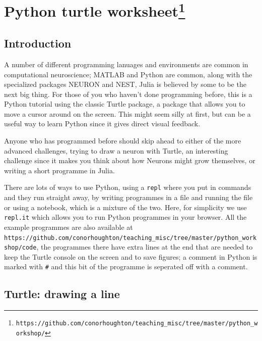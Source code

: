 \documentclass[11pt,a4paper]{scrartcl}
\begin{document}
\section*{Python turtle worksheet\footnote{\texttt{https://github.com/conorhoughton/teaching\_misc/tree/master/python\_workshop/}}}
\subsection*{Introduction}
A number of different programming lanuages and environments are common
in computational neuroscience; MATLAB and Python are common, along
with the specialized packages NEURON and NEST, Julia is believed by
some to be the next big thing. For those of you who haven't done
programming before, this is a Python tutorial using the classic Turtle
package, a package that allows you to move a cursor around on the
screen. This might seem silly at first, but can be a useful way to
learn Python since it gives direct visual feedback.

Anyone who has programmed before should skip ahead to either of the
more advanced challenges, trying to draw a neuron with Turtle, an
interesting challenge since it makes you think about how Neurons might
grow themselves, or writing a short programme in Julia.

There are lots of ways to use Python, using a \texttt{repl} where you
put in commands and they run straight away, by writing programmes in a
file and running the file or using a notebook, which is a mixture of
the two. Here, for simplicity we use \texttt{repl.it} which allows you
to run Python programmes in your browser. All the example programmes
are also available at \texttt{https://github.com/conorhoughton/teaching\_misc/tree/master/python\_workshop/code}, the programmes there have extra lines
at the end that are needed to keep the Turtle console on the screen
and to save figures; a comment in Python is marked with \texttt{\#}
and this bit of the programme is seperated off with a comment.

\subsection*{Turtle: drawing a line}
\end{document}
